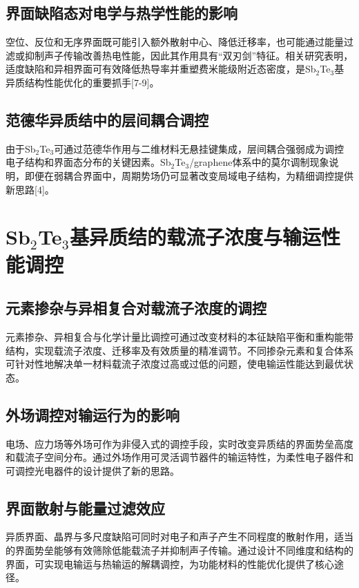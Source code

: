 \documentclass[12pt,a4paper]{ctexart}
\begin{document}
\subsection{界面缺陷态对电学与热学性能的影响}
空位、反位和无序界面既可能引入额外散射中心、降低迁移率，也可能通过能量过滤或抑制声子传输改善热电性能，因此其作用具有“双刃剑”特征。相关研究表明，适度缺陷和异相界面可有效降低热导率并重塑费米能级附近态密度，是Sb$_2$Te$_3$基异质结构性能优化的重要抓手[7-9]。

\subsection{范德华异质结中的层间耦合调控}
由于Sb$_2$Te$_3$可通过范德华作用与二维材料无悬挂键集成，层间耦合强弱成为调控电子结构和界面态分布的关键因素。Sb$_2$Te$_3$/graphene体系中的莫尔调制现象说明，即便在弱耦合界面中，周期势场仍可显著改变局域电子结构，为精细调控提供新思路[4]。

\section{\texorpdfstring{Sb$_2$Te$_3$}{Sb2Te3}基异质结的载流子浓度与输运性能调控}

\subsection{元素掺杂与异相复合对载流子浓度的调控}
元素掺杂、异相复合与化学计量比调控可通过改变材料的本征缺陷平衡和重构能带结构，实现载流子浓度、迁移率及有效质量的精准调节。不同掺杂元素和复合体系可针对性地解决单一材料载流子浓度过高或过低的问题，使电输运性能达到最优状态。

\subsection{外场调控对输运行为的影响}
电场、应力场等外场可作为非侵入式的调控手段，实时改变异质结的界面势垒高度和载流子空间分布。通过外场作用可灵活调节器件的输运特性，为柔性电子器件和可调控光电器件的设计提供了新的思路。

\subsection{界面散射与能量过滤效应}
异质界面、晶界与多尺度缺陷可同时对电子和声子产生不同程度的散射作用，适当的界面势垒能够有效筛除低能载流子并抑制声子传输。通过设计不同维度和结构的界面，可实现电输运与热输运的解耦调控，为功能材料的性能优化提供了核心途径。
\end{document}
